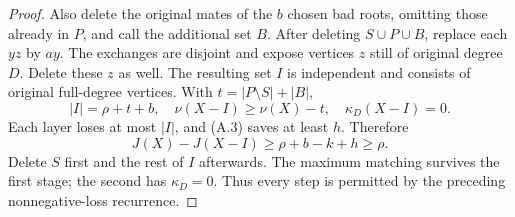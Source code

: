 \documentclass[11pt,a4paper]{article}
\theoremstyle{definition}
\begin{document}
\begin{proof}
Also delete the original mates of the $b$ chosen bad roots, omitting those already in $P$, and call the additional set $B$. After deleting $S\cup P\cup B$, replace each $yz$ by $ay$. The exchanges are disjoint and expose vertices $z$ still of original degree $D$. Delete these $z$ as well. The resulting set $I$ is independent and consists of original full-degree vertices. With $t=|P\setminus S|+|B|$,
\[
|I|=\rho+t+b,\quad \nu(X-I)\ge\nu(X)-t,\quad
\kappa_D(X-I)=0.
\]
Each layer loses at most $|I|$, and (A.3) saves at least $h$. Therefore
\[
J(X)-J(X-I)\ge\rho+b-k+h\ge\rho.
\]
Delete $S$ first and the rest of $I$ afterwards. The maximum matching survives the first stage; the second has $\kappa_D=0$. Thus every step is permitted by the preceding nonnegative-loss recurrence.
\end{proof}
\end{document}
